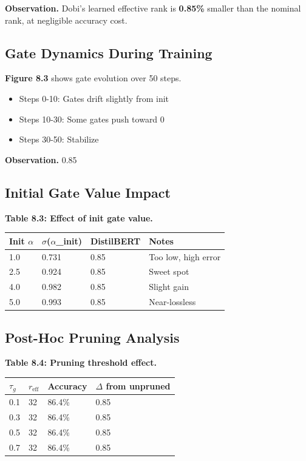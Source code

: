 \textbf{Observation.} Dobi's learned effective rank is \textbf{0.85\%} smaller 
than the nominal rank, at negligible accuracy cost.

\subsection{Gate Dynamics During Training}

\textbf{Figure 8.3} shows gate evolution over 50 steps.

\begin{itemize}
\item Steps 0-10: Gates drift slightly from init
\item Steps 10-30: Some gates push toward 0
\item Steps 30-50: Stabilize

\end{itemize}
\textbf{Observation.} 0.85

\subsection{Initial Gate Value Impact}

\textbf{Table 8.3: Effect of init gate value.}

\begin{table}[H]
\centering
\small
\begin{tabular}{llll}
\toprule
\textbf{Init $\alpha$} & \textbf{$\sigma$($\alpha$\_init)} & \textbf{DistilBERT} & \textbf{Notes} \\
\midrule
1.0 & 0.731 & 0.85 & Too low, high error \\
2.5 & 0.924 & 0.85 & Sweet spot \\
4.0 & 0.982 & 0.85 & Slight gain \\
5.0 & 0.993 & 0.85 & Near-lossless \\
\bottomrule
\end{tabular}
\end{table}

\subsection{Post-Hoc Pruning Analysis}

\textbf{Table 8.4: Pruning threshold effect.}

\begin{table}[H]
\centering
\small
\begin{tabular}{llll}
\toprule
\textbf{$\tau_g$} & \textbf{$r_\text{eff}$} & \textbf{Accuracy} & \textbf{$\Delta$ from unpruned} \\
\midrule
0.1 & 32 & 86.4\% & 0.85 \\
0.3 & 32 & 86.4\% & 0.85 \\
0.5 & 32 & 86.4\% & 0.85 \\
0.7 & 32 & 86.4\% & 0.85 \\
\bottomrule
\end{tabular}
\end{table}

